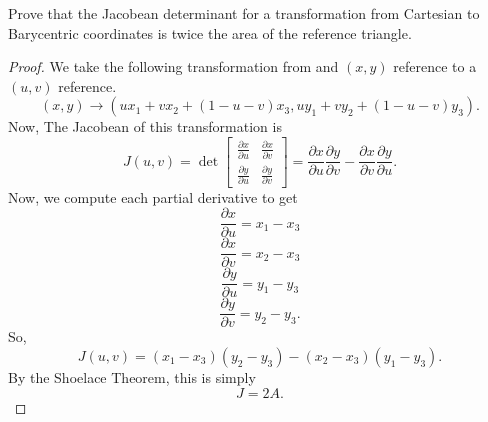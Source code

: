 \begin{example}
    Prove that the Jacobean determinant for a transformation from Cartesian to Barycentric coordinates is twice the area of the reference triangle.

    \begin{proof}
        We take the following transformation from and $(x, y)$ reference to a $(u, v)$ reference.
        \[(x, y) \to (ux_{1} + vx_{2} + (1 - u - v)x_{3}, uy_{1} + vy_{2} + (1 - u - v)y_{3}).\]
        Now, The Jacobean of this transformation is
        \[J(u, v) = \det\begin{bmatrix}
            \frac{\partial x}{\partial u} & \frac{\partial x}{\partial v} \\
            \frac{\partial y}{\partial u} & \frac{\partial y}{\partial v}
        \end{bmatrix} = \frac{\partial x}{\partial u}\frac{\partial y}{\partial v} - \frac{\partial x}{\partial v}\frac{\partial y}{\partial u}.\]
        Now, we compute each partial derivative to get
        \[\frac{\partial x}{\partial u} = x_{1} - x_{3}\]
        \[\frac{\partial x}{\partial v} = x_{2} - x_{3}\]
        \[\frac{\partial y}{\partial u} = y_{1} - y_{3}\]
        \[\frac{\partial y}{\partial v} = y_{2} - y_{3}.\]
        So,
        \[J(u, v) = (x_{1} - x_{3})(y_{2} - y_{3}) - (x_{2} - x_{3})(y_{1} - y_{3}).\]
        By the Shoelace Theorem, this is simply
        \[J = 2A.\]
    \end{proof}
\end{example}